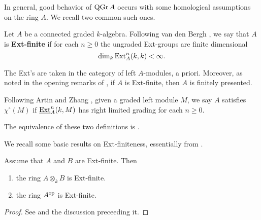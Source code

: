 In general, good behavior of \(\operatorname{QGr}A\) occurs with some homological assumptions on the ring \(A\). We recall two common such ones. 

\begin{definition} \label{definition: Ext-finite}
  Let \(A\) be a connected graded \(k\)-algebra. Following van den Bergh \parencite{VdB}, we say that \(A\) is \textbf{Ext-finite} if for each \(n \geq 0\) the ungraded Ext-groups are finite dimensional 
  \begin{displaymath}
    \operatorname{dim}_k \operatorname{Ext}_A^n (k,k) < \infty.
  \end{displaymath}
\end{definition}

\begin{remark}
  The Ext's are taken in the category of left \(A\)-modules, a priori.
  Moreover, as noted in the opening remarks of \cite[Section 4.1]{BV}, if \(A\) is Ext-finite, then \(A\) is finitely presented.
\end{remark}

\begin{definition} \label{definition: chi}
  Following Artin and Zhang \parencite{AZ94}, given a graded left module \(M\), we say \(A\) satisfies \(\chi^\circ(M)\) if \(\underline{\operatorname{Ext}}^n_A(k,M)\) has right limited grading for each \(n \geq 0\). 

\end{definition}

\begin{remark}
  The equivalence of these two definitions is \parencite[Proposition 3.8 (1)]{AZ94}.
\end{remark}

We recall some basic results on Ext-finiteness, essentially from \parencite[Section 4]{VdB}.

\begin{proposition} \label{proposition: tensor and op properties of ext-finite}
  Assume that \(A\) and \(B\) are Ext-finite. Then
  \begin{enumerate}
  \item the ring \(A \otimes_k B\) is Ext-finite. 
  \item the ring \(A^{\operatorname{op}}\) is Ext-finite.
  \end{enumerate}
\end{proposition}

\begin{proof}
  See \parencite[Lemma 4.2]{VdB} and the discussion preceeding it. 
\end{proof}

